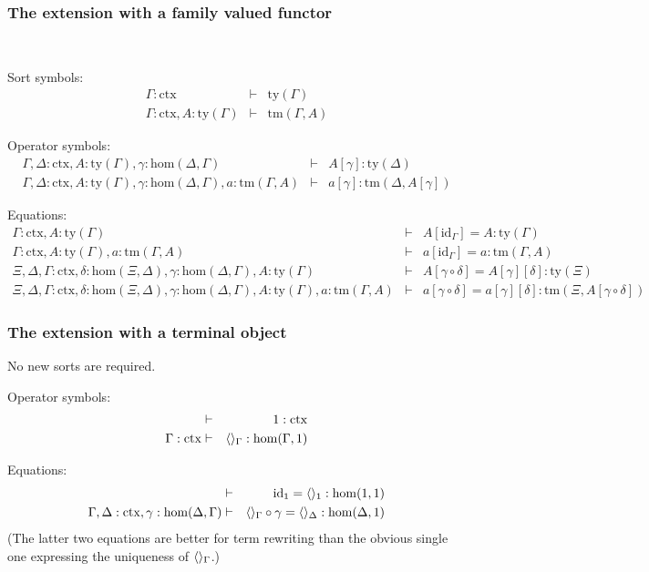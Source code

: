 \documentclass{lmcs}
\def\Hom{\mathrm{hom}}
\def\id{\mathrm{id}}
\newcommand{\ctx}{\mathrm{ctx}}
\newcommand{\ty}{\mathrm{ty}}
\newcommand{\tm}{\mathrm{tm}}
\begin{document}
\subsubsection{The extension with a family valued functor}
\mbox{ }

Sort symbols:
\begin{eqnarray*}
\Gamma : \ctx &\vdash& \ty(\Gamma)\\
\Gamma : \ctx, A:\ty(\Gamma) &\vdash& \tm(\Gamma,A)
\end{eqnarray*}

Operator symbols:
\begin{eqnarray*}
\Gamma,\Delta : \ctx, A:\ty(\Gamma), \gamma : \Hom(\Delta,\Gamma) &\vdash&
A[\gamma] : \ty(\Delta)\\
\Gamma,\Delta : \ctx, A:\ty(\Gamma), \gamma : \Hom(\Delta,\Gamma), a:\tm(\Gamma,A) &\vdash&  a[\gamma] : \tm(\Delta,A[\gamma])
\end{eqnarray*}

Equations:
\begin{eqnarray*}
\Gamma : \ctx, A:\ty(\Gamma) &\vdash& A[\id_\Gamma] = A : \ty(\Gamma)\\
\Gamma : \ctx, A:\ty(\Gamma), a:\tm(\Gamma,A) &\vdash& a[\id_\Gamma] = a : \tm(\Gamma,A)\\
\Xi,\Delta,\Gamma : \ctx, \delta : \Hom(\Xi,\Delta), \gamma : \Hom(\Delta,\Gamma),
A:\ty(\Gamma) &\vdash& A[\gamma\circ\delta] = A[\gamma][\delta]: \ty(\Xi)\\
\Xi,\Delta,\Gamma : \ctx, \delta : \Hom(\Xi,\Delta), \gamma : \Hom(\Delta,\Gamma),
A:\ty(\Gamma), a:\tm(\Gamma,A) &\vdash&
a[\gamma\circ\delta] = a[\gamma][\delta]: \tm(\Xi,A[\gamma\circ\delta])
\end{eqnarray*}

\subsubsection{The extension with a terminal object}
No new sorts are required.

Operator symbols:
\begin{eqnarray*}
&\vdash& 1 : \ctx\\
\Gamma : \ctx &\vdash& \tuple{}_\Gamma : \Hom(\Gamma,1)
\end{eqnarray*}

Equations:
\begin{eqnarray*}
 &\vdash& \id_1 = \tuple{}_1 : \Hom(1,1)\\
\Gamma,\Delta : \ctx, \gamma : \Hom(\Delta,\Gamma) &\vdash&
\tuple{}_\Gamma\circ\gamma = \tuple{}_\Delta : \Hom(\Delta,1)
\end{eqnarray*}
(The latter two equations are better for term rewriting than the
obvious single one expressing the uniqueness of $\langle  \rangle_\Gamma$.)
\end{document}
